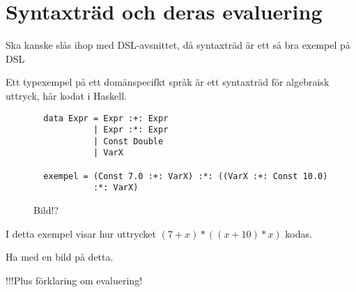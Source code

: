 \section{Syntaxträd och deras evaluering}

Ska kanske slås ihop med DSL-avsnittet, då syntaxträd är ett så bra exempel på DSL

Ett typexempel på ett domänspecifkt språk är ett syntaxträd för algebraisk uttryck, här kodat i Haskell.

\begin{figure}
  \begin{lstlisting}
  data Expr = Expr :+: Expr
            | Expr :*: Expr
            | Const Double
            | VarX

  exempel = (Const 7.0 :+: VarX) :*: ((VarX :+: Const 10.0)
            :*: VarX)
  \end{lstlisting}
  \caption{Bild!?}
  \label{fig:syntax_exempel}
\end{figure}

I detta exempel visar hur uttrycket $(7+x)*((x+10)*x)$ kodas.

Ha med en bild på detta.

!!!Plus förklaring om evaluering!



